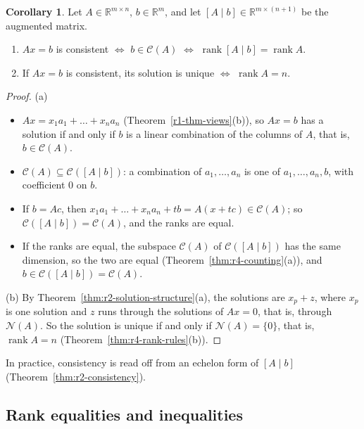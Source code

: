\documentclass[12pt]{article}
\newcommand{\R}{\mathbb R}
\DeclareMathOperator{\rank}{rank}
\theoremstyle{definition}
\newtheorem{corollary}[theorem]{Corollary}
\begin{document}
\begin{corollary}\label{cor:r4-ax-b}
Let \(A\in\R^{m\times n}\), \(b\in\R^m\), and let \([A\mid b]\in\R^{m\times(n+1)}\) be the augmented
matrix.
\begin{enumerate}
\item \(Ax=b\) is consistent \(\Leftrightarrow\) \(b\in\mathcal C(A)\) \(\Leftrightarrow\)
\(\rank[A\mid b]=\rank A\).
\item If \(Ax=b\) is consistent, its solution is unique \(\Leftrightarrow\) \(\rank A=n\).
\end{enumerate}
\end{corollary}
\begin{proof}
(a)
\begin{itemize}
\item \(Ax=x_1a_1+\dots+x_na_n\) (Theorem~\ref{r1-thm-views}(b)), so \(Ax=b\) has a solution if and only if \(b\) is
a linear combination of the columns of \(A\), that is, \(b\in\mathcal C(A)\).
\item \(\mathcal C(A)\subseteq\mathcal C([A\mid b])\): a combination of \(a_1,\dots,a_n\) is one of
\(a_1,\dots,a_n,b\), with coefficient \(0\) on \(b\).
\item If \(b=Ac\), then \(x_1a_1+\dots+x_na_n+tb=A(x+tc)\in\mathcal C(A)\); so
\(\mathcal C([A\mid b])=\mathcal C(A)\), and the ranks are equal.
\item If the ranks are equal, the subspace \(\mathcal C(A)\) of \(\mathcal C([A\mid b])\) has the
same dimension, so the two are equal (Theorem~\ref{thm:r4-counting}(a)), and
\(b\in\mathcal C([A\mid b])=\mathcal C(A)\).
\end{itemize}
(b) By Theorem~\ref{thm:r2-solution-structure}(a), the solutions are \(x_p+z\), where \(x_p\) is
one solution and \(z\) runs through the solutions of \(Ax=0\), that is, through \(\mathcal N(A)\). So
the solution is unique if and only if \(\mathcal N(A)=\{0\}\), that is, \(\rank A=n\)
(Theorem~\ref{thm:r4-rank-rules}(b)).
\end{proof}
In practice, consistency is read off from an echelon form of \([A\mid b]\)
(Theorem~\ref{thm:r2-consistency}).

\subsection*{Rank equalities and inequalities}
\end{document}
